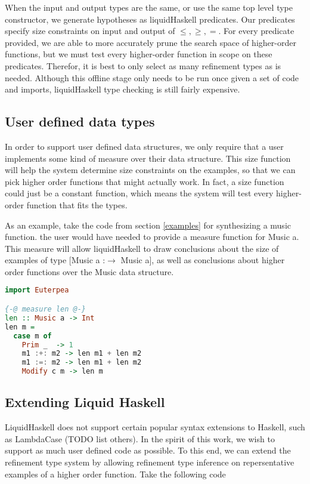When the input and output types are the same, or use the same top level type constructor, we generate hypotheses as liquidHaskell predicates.
Our predicates specify size constraints on input and output of $\leq,\geq,=$.
For every predicate provided, we are able to more accurately prune the search space of higher-order functions, but we must test every higher-order function in scope on these predicates. 
Therefor, it is best to only select as many refinement types as is needed.
Although this offline stage only needs to be run once given a set of code and imports, liquidHaskell type checking is still fairly expensive.



\subsection{User defined data types}
In order to support user defined data structures, we only require that a user implements some kind of measure\cite{realWorldLiquid} over their data structure.
This size function will help the system determine size constraints on the examples, so that we can pick higher order functions that might actually work.
In fact, a size function could just be a constant function, which means the system will test every higher-order function that fits the types. 

As an example, take the code from section \ref{examples} for synthesizing a music function.
the user would have needed to provide a measure function for Music a.
This measure will allow liquidHaskell to draw conclusions about the size of examples of type [Music a :$\to$ Music a], as well as conclusions about higher order functions over the Music data structure.

\begin{lstlisting}[language=haskell]
import Euterpea

{-@ measure len @-}
len :: Music a -> Int
len m =
  case m of
    Prim _  -> 1
    m1 :+: m2 -> len m1 + len m2
    m1 :=: m2 -> len m1 + len m2
    Modify c m -> len m
\end{lstlisting}


\subsection{Extending Liquid Haskell}\label{extLiqHask}
LiquidHaskell does not support certain popular syntax extensions to Haskell, such as LambdaCase (TODO list others). In the spirit of this work, we wish to support as much user defined code as possible. To this end, we can extend the refinement type system by allowing refinement type inference on repersentative examples of a higher order function. Take the following code 

